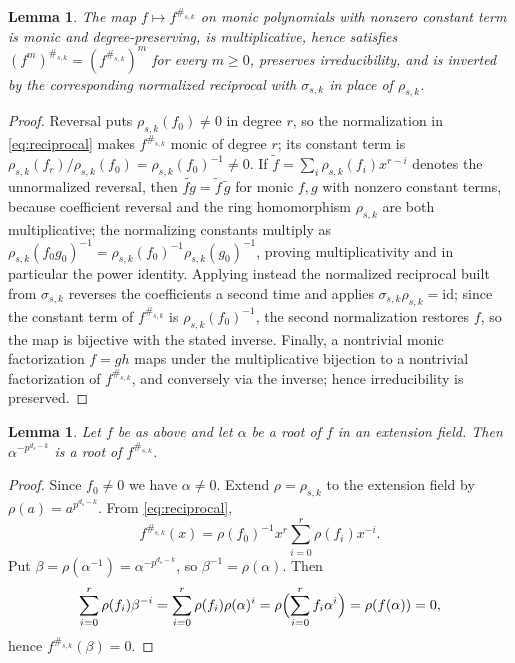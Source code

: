 \documentclass[preprint,12pt,a4paper]{elsarticle}
\newtheorem{lemma}[theorem]{Lemma}
\theoremstyle{definition}
\theoremstyle{remark}
\begin{document}
\begin{lemma}\label{lem:reciprocal}
The map $f\mapsto f^{\#_{s,k}}$ on monic polynomials with nonzero constant term
is monic and degree-preserving, is multiplicative, hence satisfies
$(f^m)^{\#_{s,k}}=(f^{\#_{s,k}})^m$ for every $m\geq0$, preserves
irreducibility, and is inverted by the corresponding normalized reciprocal with
$\sigma_{s,k}$ in place of $\rho_{s,k}$.
\end{lemma}

\begin{proof}
Reversal puts $\rho_{s,k}(f_0)\neq0$ in degree $r$, so the normalization in
\eqref{eq:reciprocal} makes $f^{\#_{s,k}}$ monic of degree $r$; its constant
term is $\rho_{s,k}(f_r)/\rho_{s,k}(f_0)=\rho_{s,k}(f_0)^{-1}\neq0$.  If
$\widetilde{f}=\sum_i\rho_{s,k}(f_i)x^{r-i}$ denotes the unnormalized reversal,
then $\widetilde{fg}=\widetilde{f}\,\widetilde{g}$ for monic $f,g$ with nonzero
constant terms, because coefficient reversal and the ring homomorphism
$\rho_{s,k}$ are both multiplicative; the normalizing constants multiply as
$\rho_{s,k}(f_0g_0)^{-1}=\rho_{s,k}(f_0)^{-1}\rho_{s,k}(g_0)^{-1}$, proving
multiplicativity and in particular the power identity.  Applying instead the
normalized reciprocal built from $\sigma_{s,k}$ reverses the coefficients a
second time and applies $\sigma_{s,k}\rho_{s,k}=\mathrm{id}$; since the constant
term of $f^{\#_{s,k}}$ is $\rho_{s,k}(f_0)^{-1}$, the second normalization
restores $f$, so the map is bijective with the stated inverse.  Finally, a
nontrivial monic factorization $f=gh$ maps under the multiplicative bijection
to a nontrivial factorization of $f^{\#_{s,k}}$, and conversely via the inverse;
hence irreducibility is preserved.
\end{proof}

\begin{lemma}\label{lem:root-action}
Let $f$ be as above and let $\alpha$ be a root of $f$ in an extension field.
Then $\alpha^{-p^{d_s-k}}$ is a root of $f^{\#_{s,k}}$.
\end{lemma}

\begin{proof}
Since $f_0\neq0$ we have $\alpha\neq0$.  Extend $\rho=\rho_{s,k}$ to the
extension field by $\rho(a)=a^{p^{d_s-k}}$.  From \eqref{eq:reciprocal},
\[
f^{\#_{s,k}}(x)=\rho(f_0)^{-1}x^r\sum_{i=0}^{r}\rho(f_i)x^{-i}.
\]
Put $\beta=\rho(\alpha^{-1})=\alpha^{-p^{d_s-k}}$, so
$\beta^{-1}=\rho(\alpha)$.  Then
{\small
\[
\sum_{i=0}^{r}\rho(f_i)\beta^{-i}
   =\sum_{i=0}^{r}\rho(f_i)\rho(\alpha)^i
   =\rho\Bigl(\sum_{i=0}^{r}f_i\alpha^i\Bigr)=\rho(f(\alpha))=0,
\]
}
hence $f^{\#_{s,k}}(\beta)=0$.
\end{proof}
\end{document}
